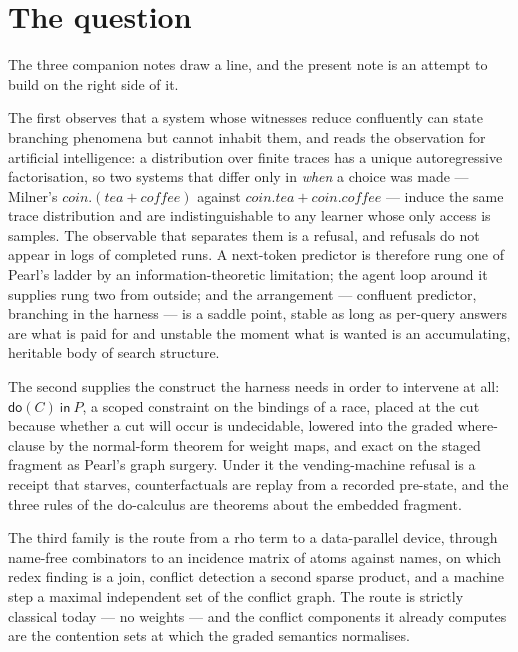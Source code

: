 \documentclass[11pt]{article}
\theoremstyle{plain}
\theoremstyle{definition}
\theoremstyle{remark}
\newcommand{\dok}{\textsf{do}}
\newcommand{\ink}{\textsf{in}}
\begin{document}
\tableofcontents

\section{The question}\label{sec:question}

The three companion notes draw a line, and the present note is an attempt to
build on the right side of it.

The first \cite{Inhabiting} observes that a system whose witnesses reduce
confluently can state branching phenomena but cannot inhabit them, and reads the
observation for artificial intelligence: a distribution over finite traces has a
unique autoregressive factorisation, so two systems that differ only in
\emph{when} a choice was made --- Milner's $\mathit{coin}.(\mathit{tea} +
\mathit{coffee})$ against $\mathit{coin}.\mathit{tea} +
\mathit{coin}.\mathit{coffee}$ --- induce the same trace distribution and are
indistinguishable to any learner whose only access is samples. The observable
that separates them is a refusal, and refusals do not appear in logs of completed
runs. A next-token predictor is therefore rung one of Pearl's ladder by an
information-theoretic limitation; the agent loop around it supplies rung two
from outside; and the arrangement --- confluent predictor, branching in the
harness --- is a saddle point, stable as long as per-query answers are what is
paid for and unstable the moment what is wanted is an accumulating, heritable
body of search structure.

The second \cite{Interventions} supplies the construct the harness needs in
order to intervene at all: $\dok(C)\ \ink\ P$, a scoped constraint on the
bindings of a race, placed at the cut because whether a cut will occur is
undecidable, lowered into the graded where-clause by the normal-form theorem for
weight maps, and exact on the staged fragment as Pearl's graph surgery. Under it
the vending-machine refusal is a receipt that starves, counterfactuals are
replay from a recorded pre-state, and the three rules of the do-calculus are
theorems about the embedded fragment.

The third family \cite{rhocomb3,matrix,matspec,saphire} is the route from a rho
term to a data-parallel device, through name-free combinators to an incidence
matrix of atoms against names, on which redex finding is a join, conflict
detection a second sparse product, and a machine step a maximal independent set
of the conflict graph. The route is strictly classical today --- no weights ---
and the conflict components it already computes are the contention sets at
which the graded semantics normalises.
\end{document}
